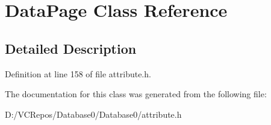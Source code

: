 \hypertarget{class_data_page}{}\section{Data\+Page Class Reference}
\label{class_data_page}


\subsection{Detailed Description}


Definition at line 158 of file attribute.\+h.



The documentation for this class was generated from the following file\+:\begin{DoxyCompactItemize}
\item 
D\+:/\+V\+C\+Repos/\+Database0/\+Database0/attribute.\+h\end{DoxyCompactItemize}
